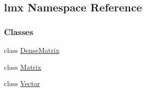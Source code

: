 \hypertarget{namespacelmx}{}\subsection{lmx Namespace Reference}
\label{namespacelmx}
\subsubsection*{Classes}
\begin{DoxyCompactItemize}
\item 
class \hyperlink{classlmx_1_1_dense_matrix}{Dense\+Matrix}
\item 
class \hyperlink{classlmx_1_1_matrix}{Matrix}
\item 
class \hyperlink{classlmx_1_1_vector}{Vector}
\end{DoxyCompactItemize}
